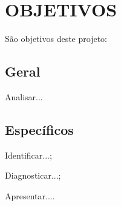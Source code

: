 \chapter{OBJETIVOS}
São objetivos deste projeto:

\section{Geral}
Analisar...

\section{Específicos}
\begin{uemaenum}
    \item Identificar...;
    \item Diagnosticar...;
    \item Apresentar....
\end{uemaenum}
